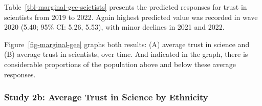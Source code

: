 \documentclass[
  single column]{article}
\begin{document}
Table~\ref{tbl-marginal-gee-scietists} presents the predicted responses
for trust in scientists from 2019 to 2022. Again highest predicted value
was recorded in wave 2020 (5.40; 95\% CI: 5.26, 5.53), with minor
declines in 2021 and 2022.

Figure~\ref{fig-marginal-gee} graphs both results: (A) average trust in
science and (B) average trust in scientists, over time. And indicated in
the graph, there is considerable proportions of the population above and
below these average responses.

\subsubsection{Study 2b: Average Trust in Science by
Ethnicity}\label{study-2b-average-trust-in-science-by-ethnicity}
\end{document}
